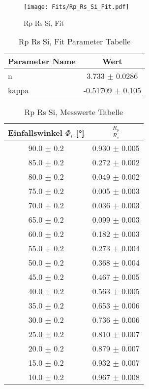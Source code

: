 \begin{figure}[ht] 
 	\centering 
 	\texttt{[image: Fits/Rp\_Rs\_Si\_Fit.pdf]} 
	\caption{Rp Rs Si, Fit} 
 	\label{fig:Rp Rs Si, Fit} 
\end{figure}
 
\begin{table}[ht] 
	\centering 
	\caption{Rp Rs Si, Fit Parameter Tabelle} 
	\label{tab: Rp Rs Si, Fit Parameter Tabelle}
	\begin{tabular}{|l|c|}
		\hline
		Parameter Name	&	Wert \\ \hline
		n	&	 3.733 $\pm$  0.0286\\ \hline
		kappa	&	-0.51709 $\pm$  0.105\\ \hline
	\end{tabular} 
\end{table}
 
\begin{table}[ht] 
	\centering 
	\caption{Rp Rs Si, Messwerte Tabelle} 
	\label{tab: Rp Rs Si, Messwerte Tabelle}
	\begin{tabular}{|c|c|}
		\hline
		Einfallswinkel $\Phi_i$ [°] 	&	 $\frac{R_p}{R_s}$\\ \hline
		90.0 $\pm$ 0.2 	&	 0.930 $\pm$ 0.005 \\ \hline
		85.0 $\pm$ 0.2 	&	 0.272 $\pm$ 0.002 \\ \hline
		80.0 $\pm$ 0.2 	&	 0.049 $\pm$ 0.002 \\ \hline
		75.0 $\pm$ 0.2 	&	 0.005 $\pm$ 0.003 \\ \hline
		70.0 $\pm$ 0.2 	&	 0.036 $\pm$ 0.003 \\ \hline
		65.0 $\pm$ 0.2 	&	 0.099 $\pm$ 0.003 \\ \hline
		60.0 $\pm$ 0.2 	&	 0.182 $\pm$ 0.003 \\ \hline
		55.0 $\pm$ 0.2 	&	 0.273 $\pm$ 0.004 \\ \hline
		50.0 $\pm$ 0.2 	&	 0.368 $\pm$ 0.004 \\ \hline
		45.0 $\pm$ 0.2 	&	 0.467 $\pm$ 0.005 \\ \hline
		40.0 $\pm$ 0.2 	&	 0.563 $\pm$ 0.005 \\ \hline
		35.0 $\pm$ 0.2 	&	 0.653 $\pm$ 0.006 \\ \hline
		30.0 $\pm$ 0.2 	&	 0.736 $\pm$ 0.006 \\ \hline
		25.0 $\pm$ 0.2 	&	 0.810 $\pm$ 0.007 \\ \hline
		20.0 $\pm$ 0.2 	&	 0.879 $\pm$ 0.007 \\ \hline
		15.0 $\pm$ 0.2 	&	 0.932 $\pm$ 0.007 \\ \hline
		10.0 $\pm$ 0.2 	&	 0.967 $\pm$ 0.008 \\ \hline
	\end{tabular} 
\end{table}
 
